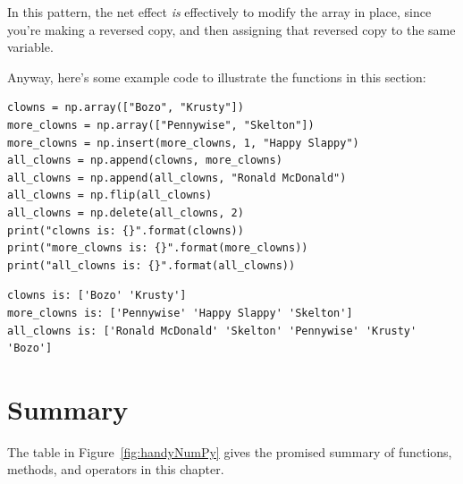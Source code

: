 In this pattern, the net effect \textit{is} effectively to modify the array in
place, since you're making a reversed copy, and then assigning that reversed
copy to the same variable.

Anyway, here's some example code to illustrate the functions in this section:

\begin{Verbatim}[fontsize=\small,samepage=true,frame=single,framesep=3mm]
clowns = np.array(["Bozo", "Krusty"])
more_clowns = np.array(["Pennywise", "Skelton"])
more_clowns = np.insert(more_clowns, 1, "Happy Slappy")
all_clowns = np.append(clowns, more_clowns)
all_clowns = np.append(all_clowns, "Ronald McDonald")
all_clowns = np.flip(all_clowns)
all_clowns = np.delete(all_clowns, 2)
print("clowns is: {}".format(clowns))
print("more_clowns is: {}".format(more_clowns))
print("all_clowns is: {}".format(all_clowns))
\end{Verbatim}

\begin{Verbatim}[fontsize=\small,samepage=true,frame=leftline,framesep=5mm,framerule=1mm]
clowns is: ['Bozo' 'Krusty']
more_clowns is: ['Pennywise' 'Happy Slappy' 'Skelton']
all_clowns is: ['Ronald McDonald' 'Skelton' 'Pennywise' 'Krusty' 'Bozo']
\end{Verbatim}



\section{Summary}

The table in Figure~\ref{fig:handyNumPy} gives the promised summary of
functions, methods, and operators in this chapter.

\setlength\extrarowheight{5pt}

